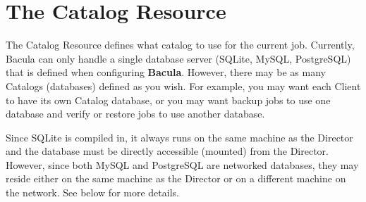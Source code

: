 \section{The Catalog Resource}
\label{CatalogResource}

The Catalog Resource defines what catalog to use for the current job.
Currently, Bacula can only handle a single database server (SQLite, MySQL,
PostgreSQL) that is defined when configuring {\bf Bacula}.  However, there
may be as many Catalogs (databases) defined as you wish.  For example, you
may want each Client to have its own Catalog database, or you may want
backup jobs to use one database and verify or restore jobs to use another
database. 

Since SQLite is compiled in, it always runs on the same machine
as the Director and the database must be directly accessible (mounted) from
the Director.  However, since both MySQL and PostgreSQL are networked
databases, they may reside either on the same machine as the Director
or on a different machine on the network.  See below for more details.

